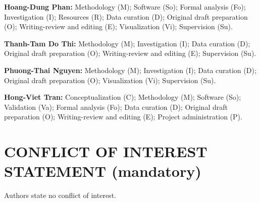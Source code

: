 \textbf{Hoang-Dung Phan:} Methodology (M); Software (So); Formal analysis (Fo); Investigation (I); Resources (R); Data curation (D); Original draft preparation (O); Writing-review and editing (E); Visualization (Vi); Supervision (Su).

\textbf{Thanh-Tam Do Thi:} Methodology (M); Investigation (I); Data curation (D); Original draft preparation (O); Writing-review and editing (E); Supervision (Su).

\textbf{Phuong-Thai Nguyen:} Methodology (M); Investigation (I); Data curation (D); Original draft preparation (O); Visualization (Vi); Supervision (Su).

\textbf{Hong-Viet Tran:} Conceptualization (C); Methodology (M); Software (So); Validation (Va); Formal analysis (Fo); Data curation (D); Original draft preparation (O); Writing-review and editing (E); Project administration (P).

\section*{CONFLICT OF INTEREST STATEMENT (mandatory)}
Authors state no conflict of interest.



